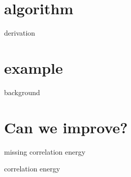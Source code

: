 \documentclass{beamer}
\begin{document}
\section{algorithm}


\begin{frame}{derivation}

\end{frame}

\section{example}
\begin{frame}{background}

\end{frame}

\section{Can we improve?}
\begin{frame}{missing correlation energy}

\end{frame}
\begin{frame}{correlation energy}

\end{frame}
\end{document}
